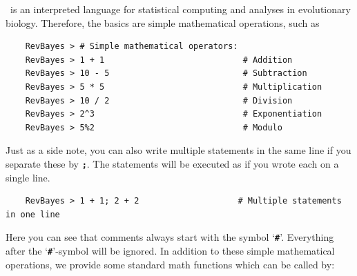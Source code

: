 \documentclass[11pt]{article}
\newcommand{\cl}[1]{{\texttt{\textbf{#1}}}}
\begin{document}
\Rev~is an interpreted language for statistical computing and analyses in evolutionary biology. Therefore, the basics are simple mathematical operations, such as 
{\tt \begin{snugshade*}
\begin{lstlisting}    
    RevBayes > # Simple mathematical operators:
    RevBayes > 1 + 1                            # Addition
    RevBayes > 10 - 5                           # Subtraction
    RevBayes > 5 * 5                            # Multiplication
    RevBayes > 10 / 2                           # Division
    RevBayes > 2^3                              # Exponentiation
    RevBayes > 5%2                              # Modulo
\end{lstlisting}
\end{snugshade*}}
Just as a side note, you can also write multiple statements in the same line if you separate these by \cl{;}.
The statements will be executed as if you wrote each on a single line.
{\tt \begin{snugshade*}
\begin{lstlisting}    
    RevBayes > 1 + 1; 2 + 2                    # Multiple statements in one line
\end{lstlisting}
\end{snugshade*}}
    
Here you can see that comments always start with the symbol `\cl{\#}'. 
Everything after the `\cl{\#}'-symbol will be ignored.
In addition to these simple mathematical operations, we provide some standard math functions which can be called by:
    
\end{document}
